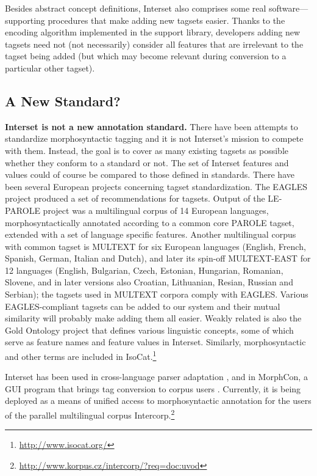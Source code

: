 \documentclass[11pt]{article}
\begin{document}
Besides abstract concept definitions, Interset also comprises some real software---supporting procedures that make adding new tagsets easier. Thanks to the encoding algorithm implemented in the support library, developers adding new tagsets need not (not necessarily) consider all features that are irrelevant to the tagset being added (but which may become relevant during conversion to a particular other tagset).

\subsection{A New Standard?}
\label{sec:notastandard}

\textbf{Interset is not a new annotation standard.} There have been attempts to standardize morphosyntactic tagging and it is not Interset's mission to compete with them. Instead, the goal is to cover as many existing tagsets as possible whether they conform to a standard or not. The set of Interset features and values could of course be compared to those defined in standards. There have been several European projects concerning tagset standardization. The EAGLES project \citep{eagles, LeechWilson1999} produced a set of recommendations for tagsets. Output of the LE-PAROLE project \citep{parole} was a multilingual corpus of 14 European languages, morphosyntactically annotated according to a common core PAROLE tagset, extended with a set of language specific features. Another multilingual corpus with common tagset is MULTEXT \citep{multext} for six European languages (English, French, Spanish, German, Italian and Dutch), and later its spin-off MULTEXT-EAST \citep{multext-east} for 12 languages (English, Bulgarian, Czech, Estonian, Hungarian, Romanian, Slovene, and in later versions also Croatian, Lithuanian, Resian, Russian and Serbian); the tagsets used in MULTEXT corpora comply with EAGLES. Various EAGLES-compliant tagsets can be added to our system and their mutual similarity will probably make adding them all easier. Weakly related is also the Gold Ontology project \citep{gold-ontology} that defines various linguistic concepts, some of which serve as feature names and feature values in Interset. Similarly, morphosyntactic and other terms are included in IsoCat.\footnote{\url{http://www.isocat.org/}}

Interset has been used in cross-language parser adaptation \citep{ZemanResnik2008}, and in MorphCon, a GUI program that brings tag conversion to corpus users \citep{morphcon}. Currently, it is being deployed as a means of unified access to morphosyntactic annotation for the users of the parallel multilingual corpus Intercorp.\footnote{\url{http://www.korpus.cz/intercorp/?req=doc:uvod}}
\end{document}
